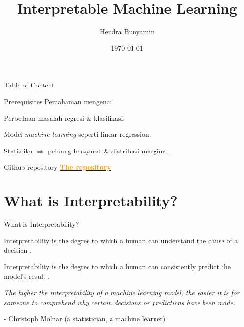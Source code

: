 \documentclass[aspectratio=169]{beamer}
\title[Interpretability]{Interpretable Machine Learning}
\author{Hendra Bunyamin}
\institute{Maranatha Christian University}
\date{\today}
\begin{document}
\maketitle


\begin{frame}{Table of Content}
    \tableofcontents
\end{frame}

\begin{frame}{Prerequisites}
	Pemahaman mengenai
	\begin{vfilleditems}
		\item Perbedaan masalah regresi \& klasifikasi.
		\item Model \textit{machine learning} seperti linear regression.
		\item Statistika $\Rightarrow$ peluang bersyarat \& distribusi marginal.
	\end{vfilleditems}
\end{frame}

\begin{frame}{Github repository}
	\href{https://github.com/hbunyamin/2021-nuni-it-online-seminar}{\textcolor{orange}{\textbf{The repository}} }
\end{frame}

\section{What is Interpretability?}
\begin{frame}{What is Interpretability? }
    \begin{vfilleditems}
	\item Interpretability is the degree to which a human can understand the cause of a decision  \citep{miller2019explanation}.
	\item Interpretability is the degree to which a human can consistently predict the model's result \citep{kim2016examples}.
	\end{vfilleditems}
\end{frame}

\begin{frame}
	\centering
	\textit{The higher the interpretability of a machine learning model, the easier it is for someone to comprehend why certain decisions or predictions have been made.}
	
	\bigskip
	- Christoph Molnar (a statistician, a machine learner)
\end{frame}
\end{document}
